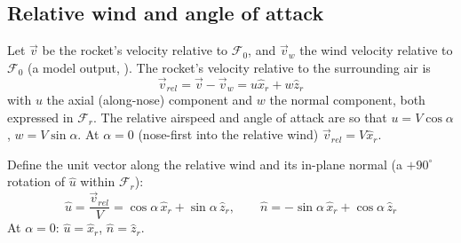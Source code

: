 \subsection{Relative wind and angle of attack}\label{sec:relwind}
Let $\vec{v}$ be the rocket's velocity relative to $\mathcal{F}_0$, and $\vec{v}_w$ the wind
velocity relative to $\mathcal{F}_0$ (a model output, ). The rocket's velocity
relative to the surrounding air is
\begin{equation}
    \vec{v}_{rel} = \vec{v} - \vec{v}_w = u\hat{x}_r + w\hat{z}_r
\end{equation}
with $u$ the axial (along-nose) component and $w$ the normal component, both expressed in
$\mathcal{F}_r$. The relative airspeed and angle of attack are
so that $u = V\cos\alpha$, $w = V\sin\alpha$. At $\alpha = 0$ (nose-first into the relative wind)
$\vec{v}_{rel} = V\hat{x}_r$.

Define the unit vector along the relative wind and its in-plane normal (a $+90^\circ$ rotation of
$\hat{u}$ within $\mathcal{F}_r$):
\begin{equation}
    \hat{u} = \frac{\vec{v}_{rel}}{V} = \cos\alpha\,\hat{x}_r + \sin\alpha\,\hat{z}_r, \qquad
    \hat{n} = -\sin\alpha\,\hat{x}_r + \cos\alpha\,\hat{z}_r
\end{equation}
At $\alpha = 0$: $\hat{u} = \hat{x}_r$, $\hat{n} = \hat{z}_r$.

